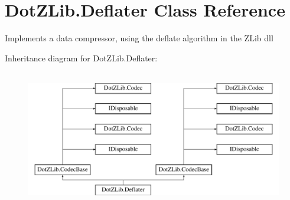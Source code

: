\hypertarget{class_dot_z_lib_1_1_deflater}{}\section{Dot\+Z\+Lib.\+Deflater Class Reference}
\label{class_dot_z_lib_1_1_deflater}


Implements a data compressor, using the deflate algorithm in the Z\+Lib dll  


Inheritance diagram for Dot\+Z\+Lib.\+Deflater\+:\begin{figure}[H]
\begin{center}
\leavevmode
\includegraphics[height=6.000000cm]{class_dot_z_lib_1_1_deflater}
\end{center}
\end{figure}
